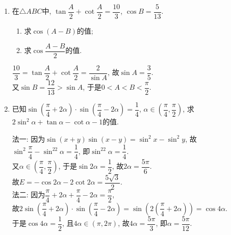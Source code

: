 \begin{enumerate}
\begin{jieda}
\begin{enumerate}
$
=\cos ^2 a-\frac{1}{2} \cos 2 a=\cos ^2 a-\frac{1}{2}\left(2 \cos ^2 a-1\right)=\frac{1}{2}
$


\item $\dfrac{(1+\sin a+\cos a)\left(\sin \dfrac{a}{2}-\cos \dfrac{a}{2}\right)}{\sqrt{2+2 \cos a}}=\dfrac{\left(1+2 \sin \dfrac{a}{2} \cos \dfrac{a}{2}+2 \cos ^2 \dfrac{a}{2}-1\right)\left(\sin \dfrac{a}{2}-\cos \dfrac{a}{2}\right)}{\sqrt{2+2\left(2 \cos ^2 \dfrac{a}{2}-1\right)}}$

\end{enumerate} 
\end{jieda}

\item 在$\triangle{ABC}$中, $\tan\dfrac{A}{2}+\cot\dfrac{A}{2}=\dfrac{10}{3}$, $\cos{B}=\dfrac{5}{13}$. 
\begin{enumerate}[(1)]
\item 求$\cos(A-B)$的值; 
\item 求$\cos\dfrac{A-B}{2}$的值. 
\end{enumerate}
\begin{jieda}
$\dfrac{10}{3}=\tan\dfrac{A}{2}+\cot\dfrac{A}{2}=\dfrac{2}{\sin{A}}$, 故$\sin{A}=\dfrac{3}{5}$. \\
又$\sin{B}=\dfrac{12}{13}>\sin{A}$, 于是$0<A<B<\dfrac{\pi}{2}$. \\
\end{jieda}

\item 已知$\sin\left(\dfrac{\pi}{4}+2\alpha\right)\cdot\sin\left(\dfrac{\pi}{4}-2\alpha\right)=\dfrac{1}{4}$, $\alpha\in\left(\dfrac{\pi}{4},\dfrac{\pi}{2}\right)$, 
求$2\sin^2\alpha+\tan\alpha-\cot\alpha-1$的值. 
\begin{jieda}
法一: 因为$\sin(x+y)\sin(x-y)=\sin^2x-\sin^2y$, 
故$\sin^2\dfrac{\pi}{4}-\sin^22\alpha=\dfrac{1}{4}$, 即$\sin^22\alpha=\dfrac{1}{4}$. \\
又$\alpha\in\left(\dfrac{\pi}{4},\dfrac{\pi}{2}\right)$, 于是$\sin2\alpha=\dfrac{1}{2}$, 故$2\alpha=\dfrac{5\pi}{6}$. \\
故$E=-\cos2\alpha-2\cot2\alpha=\dfrac{5\sqrt{3}}{2}$. \\
法二: 因为$\dfrac{\pi}{4}+2\alpha+\dfrac{\pi}{4}-2\alpha=\dfrac{\pi}{2}$, \\
故$2\sin\left(\dfrac{\pi}{4}+2\alpha\right)\cdot\sin\left(\dfrac{\pi}{4}-2\alpha\right)=\sin\left(2\left(\dfrac{\pi}{4}+2\alpha\right)\right)=\cos4\alpha$. \\
于是$\cos4\alpha=\dfrac{1}{2}$, 且$4\alpha\in\left(\pi,2\pi\right)$, 故$4\alpha=\dfrac{5\pi}{3}$, 即$\alpha=\dfrac{5\pi}{12}$. 
\end{jieda}


\end{enumerate}
